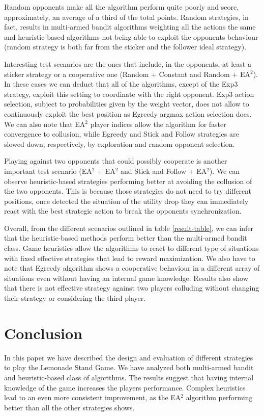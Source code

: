 \documentclass[runningheads]{llncs}
\begin{document}
Random opponents make all the algorithm perform quite
poorly and score, approximately, an average of a third of the total
points. Random strategies, in fact, results in multi-armed bandit
algorithms weighting all the actions the same and heuristic-based
algorithms not being able to exploit the opponents behaviour (random
strategy is both far from the sticker and the follower ideal strategy).

Interesting test scenarios are the ones that include, in the
opponents, at least a sticker strategy or a cooperative one (Random +
Constant and Random + EA$^2$). In these cases we can deduct that all
of the algorithms, except of the Exp3 strategy, exploit this setting
to coordinate with the right opponent. Exp3 action selection, subject
to probabilities given by the weight vector, does not allow to
continuously exploit the best position as Egreedy argmax action
selection does. We can also note that EA$^2$ player indices allow the
algorithm for faster convergence to collusion, while Egreedy and
Stick and Follow strategies are slowed down, respectively, by
exploration and random opponent selection.

Playing against two opponents that could possibly cooperate is another
important test scenario (EA$^2$ + EA$^2$ and Stick and Follow +
EA$^2$). We can observe heuristic-based strategies performing better
at avoiding the collusion of the two opponents. This is because those
strategies do not need to try different positions, once detected the
situation of the utility drop they can immediately react with the best
strategic action to break the opponents synchronization. 

Overall, from the different scenarios outlined in table
\ref{result-table}, we can infer that the heuristic-based methods
perform better than the multi-armed bandit class. Game heuristics
allow the algorithms to react to different type of situations with
fixed effective strategies that lead to reward maximization. We also
have to note that Egreedy algorithm shows a cooperative behaviour in a
different array of situations even without having an internal game
knowledge. Results also show that there is not effective strategy
against two players colluding without changing their strategy or
considering the third player.

\section{Conclusion}
In this paper we have described the design and evaluation of different
strategies to play the Lemonade Stand Game. We have analyzed both
multi-armed bandit and heuristic-based class of algorithms. The
results suggest that having internal knowledge of the game increases
the players performance. Complex heuristics lead to an even more
consistent improvement, as the EA$^2$ algorithm performing better than
all the other strategies shows.
\end{document}
